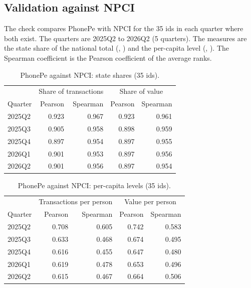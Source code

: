 \documentclass[11pt,a4paper]{article}
\begin{document}
\subsection{Validation against NPCI}
The check compares PhonePe with NPCI for the 35 ids in each quarter where both exist. The quarters are 2025Q2 to 2026Q2 (5 quarters). The measures are the state share of the national total (, ) and the per-capita level (, ). The Spearman coefficient is the Pearson coefficient of the average ranks.
\begin{table}[h]
\centering
\caption{PhonePe against NPCI: state shares (35 ids).}
\begin{tabular}{lrrrr}
\toprule
 & \multicolumn{2}{c}{Share of transactions} & \multicolumn{2}{c}{Share of value} \\
Quarter & Pearson & Spearman & Pearson & Spearman \\
\midrule
2025Q2 & 0.923 & 0.967 & 0.923 & 0.961 \\
2025Q3 & 0.905 & 0.958 & 0.898 & 0.959 \\
2025Q4 & 0.897 & 0.954 & 0.897 & 0.955 \\
2026Q1 & 0.901 & 0.953 & 0.897 & 0.956 \\
2026Q2 & 0.901 & 0.956 & 0.897 & 0.954 \\
\bottomrule
\end{tabular}
\end{table}
\begin{table}[h]
\centering
\caption{PhonePe against NPCI: per-capita levels (35 ids).}
\begin{tabular}{lrrrr}
\toprule
 & \multicolumn{2}{c}{Transactions per person} & \multicolumn{2}{c}{Value per person} \\
Quarter & Pearson & Spearman & Pearson & Spearman \\
\midrule
2025Q2 & 0.708 & 0.605 & 0.742 & 0.583 \\
2025Q3 & 0.633 & 0.468 & 0.674 & 0.495 \\
2025Q4 & 0.616 & 0.455 & 0.647 & 0.480 \\
2026Q1 & 0.619 & 0.478 & 0.653 & 0.496 \\
2026Q2 & 0.615 & 0.467 & 0.664 & 0.506 \\
\bottomrule
\end{tabular}
\end{table}
\end{document}
